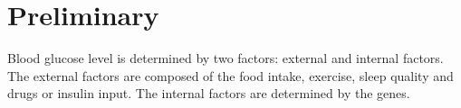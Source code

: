 
\section{Preliminary}
\label{sec:preliminary}

Blood glucose level is determined by two factors: external and internal factors. 
The external factors are composed of the food intake, exercise,  sleep quality and drugs or insulin input. 
The internal factors are determined by the genes. 